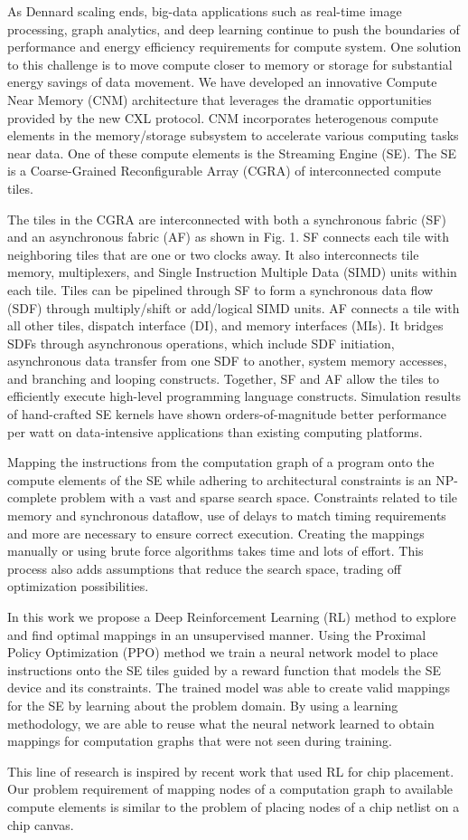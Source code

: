 As Dennard scaling ends, big-data applications such as real-time image processing, graph analytics, and deep learning continue to push the boundaries of performance and energy efficiency requirements for compute system. 
One solution to this challenge is to move compute closer to memory or storage for substantial energy savings of data movement. 
We have developed an innovative Compute Near Memory (CNM) architecture that leverages the dramatic opportunities provided by the new CXL protocol. 
CNM incorporates heterogenous compute elements in the memory/storage subsystem to accelerate various computing tasks near data. 
One of these compute elements is the Streaming Engine (SE). The SE is a Coarse-Grained Reconfigurable Array (CGRA) of interconnected compute tiles.  

The tiles in the CGRA are interconnected with both a synchronous fabric (SF) and an asynchronous fabric (AF) as shown in Fig. 1. SF connects each tile with neighboring tiles that are one or two clocks away. 
It also interconnects tile memory, multiplexers, and Single Instruction Multiple Data (SIMD) units within each tile. 
Tiles can be pipelined through SF to form a synchronous data flow (SDF) through multiply/shift or add/logical SIMD units. 
AF connects a tile with all other tiles, dispatch interface (DI), and memory interfaces (MIs). 
It bridges SDFs through asynchronous operations, which include SDF initiation, asynchronous data transfer from one SDF to another, system memory accesses, and branching and looping constructs. 
Together, SF and AF allow the tiles to efficiently execute high-level programming language constructs. 
Simulation results of hand-crafted SE kernels have shown orders-of-magnitude better performance per watt on data-intensive applications than existing computing platforms.

Mapping the instructions from the computation graph of a program onto the compute elements of the SE while adhering to architectural constraints is an NP-complete problem with a vast and sparse search space. 
Constraints related to tile memory and synchronous dataflow, use of delays to match timing requirements and more are necessary to ensure correct execution. 
Creating the mappings manually or using brute force algorithms takes time and lots of effort. 
This process also adds assumptions that reduce the search space, trading off optimization possibilities.  

In this work we propose a Deep Reinforcement Learning (RL) method to explore and find optimal mappings in an unsupervised manner. 
Using the Proximal Policy Optimization (PPO) method we train a neural network model to place instructions onto the SE tiles guided by a reward function that models the SE device and its constraints. 
The trained model was able to create valid mappings for the SE by learning about the problem domain. 
By using a learning methodology, we are able to reuse what the neural network learned to obtain mappings for computation graphs that were not seen during training.  

This line of research is inspired by recent work that used RL for chip placement. 
Our problem requirement of mapping nodes of a computation graph to available compute elements is similar to the problem of placing nodes of a chip netlist on a chip canvas. 